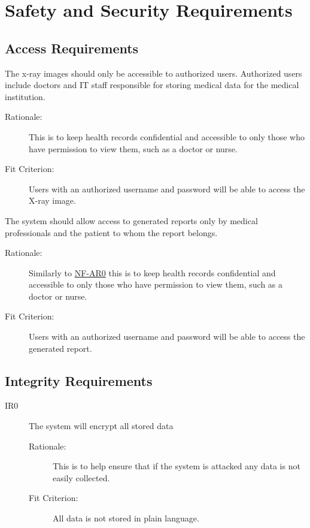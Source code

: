 \documentclass{article}
\begin{document}
\section{Safety and Security Requirements}
\subsection{Access Requirements}
\begin{description}
\hypertarget{AR0}{}
    \item[AR0] The x-ray images should only be accessible to authorized users. Authorized users include doctors and IT staff responsible for storing medical data for the medical institution. 
    \begin{description}
        \item[Rationale:] This is to keep health records confidential and accessible to only those who have permission to view them, such as a doctor or nurse. 
        \item[Fit Criterion:] Users with an authorized username and password will be able to access the X-ray image.
    \end{description}
    \item[AR1] The system should allow access to generated reports only by medical professionals and the patient to whom the report belongs. 
    \begin{description}
        \item[Rationale:] Similarly to \hyperlink{AR0}{NF-AR0} this is to keep health records confidential and accessible to only those who have permission to view them, such as a doctor or nurse. 
        \item[Fit Criterion:] Users with an authorized username and password will be able to access the generated report.
    \end{description}
\end{description}

\subsection{Integrity Requirements}
\begin{description}
    \item[IR0] The system will encrypt all stored data 
    \begin{description}
        \item[Rationale:] This is to help ensure that if the system is attacked any data is not easily collected. 
        \item[Fit Criterion:] All data is not stored in plain language. 
    \end{description}
\end{description}
\end{document}
